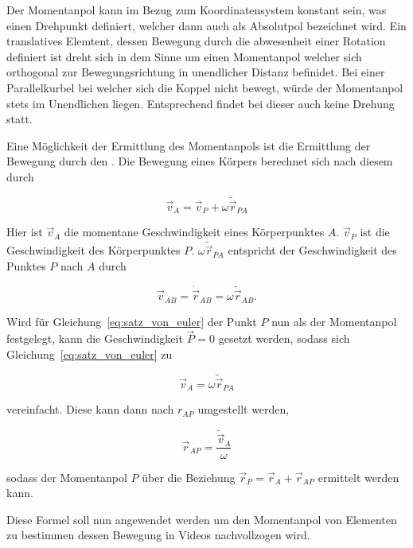 Der Momentanpol kann im Bezug zum Koordinatensystem konstant sein, was einen Drehpunkt definiert, welcher dann auch als Absolutpol bezeichnet wird.
Ein translatives Elemtent, dessen Bewegung durch die abwesenheit einer Rotation definiert ist dreht sich in dem Sinne um einen Momentanpol welcher sich orthogonal zur Bewegungsrichtung in unendlicher Distanz befinidet.
Bei einer Parallelkurbel bei welcher sich die Koppel nicht bewegt, würde der Momentanpol stets im Unendlichen liegen.
Entsprechend findet bei dieser auch keine Drehung statt.

Eine Möglichkeit der Ermittlung des Momentanpols ist die Ermittlung der Bewegung durch den \cite{Goessner2016}.
Die Bewegung eines Körpers berechnet sich nach diesem durch

\begin{equation}
    \vec{v}_A = \vec{v}_P + \omega \tilde{\vec{r}}_{PA}
    \label{eq:satz_von_euler}
\end{equation} 

Hier ist $\vec{v}_A$ die momentane Geschwindigkeit eines Körperpunktes $A$.
$\vec{v}_P$ ist die Geschwindigkeit des Körperpunktes $P$.
$\omega\tilde{\vec{r}}_{PA}$ entspricht der Geschwindigkeit des Punktes $P$ nach $A$ durch

\begin{equation}
    \vec{v}_{AB} = \dot{\vec{r}}_{AB} = \omega \tilde{\vec{r}}_{AB}.
    \label{eq:absolut_zu_winkel}
\end{equation}

Wird für Gleichung~\ref{eq:satz_von_euler} der Punkt $P$ nun als der Momentanpol festgelegt, kann die Geschwindigkeit $\vec{P} = 0$ gesetzt werden,
sodass sich Gleichung~\ref{eq:satz_von_euler} zu

\begin{equation}
    \vec{v}_A = \omega \tilde{\vec{r}}_{PA}
    \label{eq:satz_von_euler_momentanpol}
\end{equation}

vereinfacht. 
Diese kann dann nach $r_{AP}$ umgestellt werden,

\begin{equation}
    \vec{r}_{AP} = \frac{\tilde{\vec{v}}_A}{\omega}
    \label{eq:euler_rAP}
\end{equation}

sodass der Momentanpol $P$ über die Beziehung $\vec{r}_P = \vec{r}_A + \vec{r}_{AP}$ ermittelt werden kann.

Diese Formel soll nun angewendet werden um den Momentanpol von Elementen zu bestimmen dessen Bewegung in Videos nachvollzogen wird.


